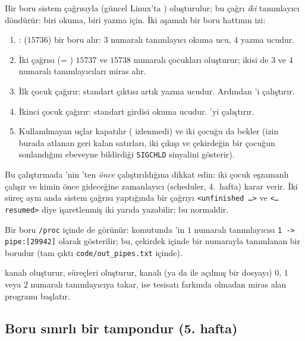 Bir boru  sistem çağrısıyla (güncel Linux'ta ) oluşturulur; bu çağrı \emph{iki} tanımlayıcı döndürür: biri okuma, biri yazma için. İki aşamalı bir boru hattının izi:



\begin{enumerate}[leftmargin=1.4em]
  \item {}:  ($15736$) bir boru alır: $3$ numaralı tanımlayıcı okuma ucu, $4$ yazma ucudur.
  \item İki  çağrısı (= ) $15737$ ve $15738$ numaralı çocukları oluşturur; ikisi de $3$ ve $4$ numaralı tanımlayıcıları miras alır.
  \item İlk çocuk  çağırır: standart çıktısı artık yazma ucudur. Ardından 'i çalıştırır.
  \item İkinci çocuk  çağırır: standart girdisi okuma ucudur. 'yi çalıştırır.
  \item Kullanılmayan uçlar kapatılır ( izlenmedi) ve  iki çocuğu da bekler (izin burada atlanan geri kalan satırları, iki çıkışı ve çekirdeğin bir çocuğun sonlandığını ebeveyne bildirdiği \texttt{SIGCHLD} sinyalini gösterir).
\end{enumerate}
Bu çalıştırmada 'nin 'ten \emph{önce} çalıştırıldığına dikkat edin: iki çocuk eşzamanlı çalışır ve kimin önce gideceğine zamanlayıcı (scheduler, 4.~hafta) karar verir. İki süreç aynı anda sistem çağrısı yaptığında  bir çağrıyı \texttt{<unfinished \dots>} ve \texttt{<\dots{} resumed>} diye işaretlenmiş iki yarıda yazabilir; bu normaldir.

Bir boru \texttt{/proc} içinde de görünür:  komutunda 'in $1$ numaralı tanımlayıcısı \texttt{1 -> pipe:[29942]} olarak gösterilir; bu, çekirdek içinde bir numarayla tanımlanan bir borudur (tam çıktı \texttt{code/out\_pipes.txt} içinde).

\begin{keyidea}
 kanalı oluşturur,  süreçleri oluşturur,  kanalı (ya da  ile açılmış bir dosyayı) $0$, $1$ veya $2$ numaralı tanımlayıcıya takar,  ise tesisatı farkında olmadan miras alan programı başlatır.
\end{keyidea}

\subsection{Boru sınırlı bir tampondur (5. hafta)}

